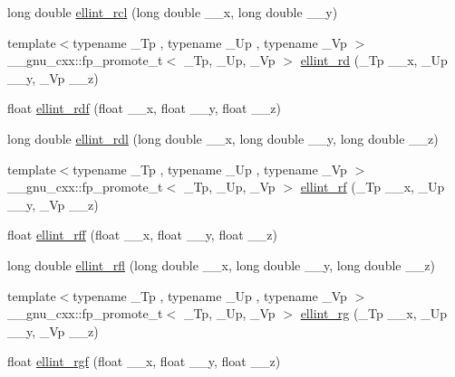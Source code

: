 \begin{DoxyCompactItemize}
\item 
long double \hyperlink{group__mathsf__gnu_ga9b2f1cdeacd3615c702a77d995a0129c}{ellint\+\_\+rcl} (long double \+\_\+\+\_\+x, long double \+\_\+\+\_\+y)
\item 
{\footnotesize template$<$typename \+\_\+\+Tp , typename \+\_\+\+Up , typename \+\_\+\+Vp $>$ }\\\+\_\+\+\_\+gnu\+\_\+cxx\+::fp\+\_\+promote\+\_\+t$<$ \+\_\+\+Tp, \+\_\+\+Up, \+\_\+\+Vp $>$ \hyperlink{group__mathsf__gnu_gad29dae6abc783c8fe952dba477e65309}{ellint\+\_\+rd} (\+\_\+\+Tp \+\_\+\+\_\+x, \+\_\+\+Up \+\_\+\+\_\+y, \+\_\+\+Vp \+\_\+\+\_\+z)
\item 
float \hyperlink{group__mathsf__gnu_ga52e7cc797b9d199b7468cdbec6505357}{ellint\+\_\+rdf} (float \+\_\+\+\_\+x, float \+\_\+\+\_\+y, float \+\_\+\+\_\+z)
\item 
long double \hyperlink{group__mathsf__gnu_ga68a38a5f320a7184cec4b120ddef6a65}{ellint\+\_\+rdl} (long double \+\_\+\+\_\+x, long double \+\_\+\+\_\+y, long double \+\_\+\+\_\+z)
\item 
{\footnotesize template$<$typename \+\_\+\+Tp , typename \+\_\+\+Up , typename \+\_\+\+Vp $>$ }\\\+\_\+\+\_\+gnu\+\_\+cxx\+::fp\+\_\+promote\+\_\+t$<$ \+\_\+\+Tp, \+\_\+\+Up, \+\_\+\+Vp $>$ \hyperlink{group__mathsf__gnu_gae4859494464c7eaf98193f92b2235bc1}{ellint\+\_\+rf} (\+\_\+\+Tp \+\_\+\+\_\+x, \+\_\+\+Up \+\_\+\+\_\+y, \+\_\+\+Vp \+\_\+\+\_\+z)
\item 
float \hyperlink{group__mathsf__gnu_ga39acf5c69a85f9b687478b32847156da}{ellint\+\_\+rff} (float \+\_\+\+\_\+x, float \+\_\+\+\_\+y, float \+\_\+\+\_\+z)
\item 
long double \hyperlink{group__mathsf__gnu_ga38dd36b3db5bbe5da516d0cbe3ff1f21}{ellint\+\_\+rfl} (long double \+\_\+\+\_\+x, long double \+\_\+\+\_\+y, long double \+\_\+\+\_\+z)
\item 
{\footnotesize template$<$typename \+\_\+\+Tp , typename \+\_\+\+Up , typename \+\_\+\+Vp $>$ }\\\+\_\+\+\_\+gnu\+\_\+cxx\+::fp\+\_\+promote\+\_\+t$<$ \+\_\+\+Tp, \+\_\+\+Up, \+\_\+\+Vp $>$ \hyperlink{group__mathsf__gnu_gadf618529d6106c1c1bc1e9212c4fed12}{ellint\+\_\+rg} (\+\_\+\+Tp \+\_\+\+\_\+x, \+\_\+\+Up \+\_\+\+\_\+y, \+\_\+\+Vp \+\_\+\+\_\+z)
\item 
float \hyperlink{group__mathsf__gnu_ga7a4ab348bf312a3425501ac8a3d16494}{ellint\+\_\+rgf} (float \+\_\+\+\_\+x, float \+\_\+\+\_\+y, float \+\_\+\+\_\+z)
\item 

\end{DoxyCompactItemize}
